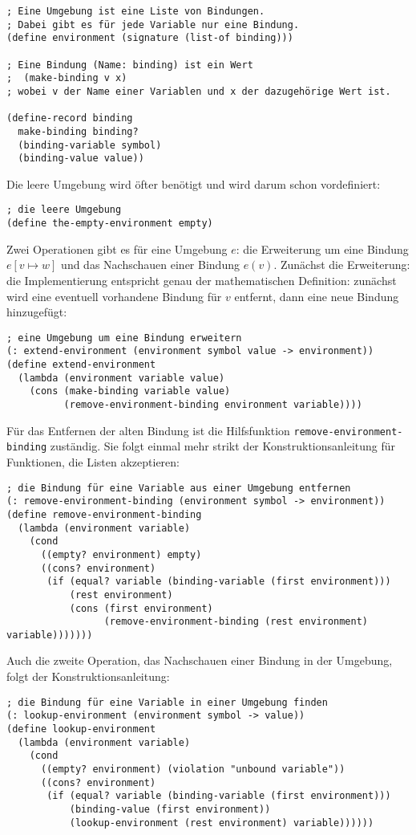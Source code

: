 \begin{lstlisting}
; Eine Umgebung ist eine Liste von Bindungen.
; Dabei gibt es für jede Variable nur eine Bindung.
(define environment (signature (list-of binding)))

; Eine Bindung (Name: binding) ist ein Wert
;  (make-binding v x)
; wobei v der Name einer Variablen und x der dazugehörige Wert ist.

(define-record binding
  make-binding binding?
  (binding-variable symbol)
  (binding-value value))
\end{lstlisting}
% 
Die leere Umgebung wird öfter benötigt und wird darum schon
vordefiniert:
%
\begin{lstlisting}
; die leere Umgebung
(define the-empty-environment empty)
\end{lstlisting}
%
Zwei Operationen gibt es für eine Umgebung $e$: die Erweiterung um
eine Bindung $e[v\mapsto w]$ und das Nachschauen einer Bindung
$e(v)$.  Zunächst die Erweiterung: die Implementierung entspricht
genau der mathematischen Definition: zunächst wird eine eventuell
vorhandene Bindung für $v$ entfernt, dann eine neue Bindung
hinzugefügt:
% 
\begin{lstlisting}
; eine Umgebung um eine Bindung erweitern
(: extend-environment (environment symbol value -> environment))
(define extend-environment
  (lambda (environment variable value)
    (cons (make-binding variable value)
          (remove-environment-binding environment variable))))
\end{lstlisting}
%
Für das Entfernen der alten Bindung ist die Hilfsfunktion
\lstinline{remove-environment-binding} zuständig.  Sie folgt einmal mehr
strikt der Konstruktionsanleitung für Funktionen, die Listen akzeptieren:
\begin{lstlisting}
; die Bindung für eine Variable aus einer Umgebung entfernen
(: remove-environment-binding (environment symbol -> environment))
(define remove-environment-binding
  (lambda (environment variable)
    (cond
      ((empty? environment) empty)
      ((cons? environment)
       (if (equal? variable (binding-variable (first environment)))
           (rest environment)
           (cons (first environment)
                 (remove-environment-binding (rest environment) variable)))))))
\end{lstlisting} 
%
Auch die zweite Operation, das Nachschauen einer Bindung in der
Umgebung, folgt der Konstruktionsanleitung:
%
%
\begin{lstlisting}
; die Bindung für eine Variable in einer Umgebung finden
(: lookup-environment (environment symbol -> value))
(define lookup-environment
  (lambda (environment variable)
    (cond
      ((empty? environment) (violation "unbound variable"))
      ((cons? environment)
       (if (equal? variable (binding-variable (first environment)))
           (binding-value (first environment))
           (lookup-environment (rest environment) variable))))))
\end{lstlisting}
